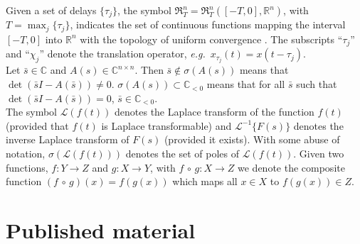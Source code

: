 \indent Given a set of delays $\{\tau_j\}$, the symbol $\mathfrak{R}_T^n=\mathfrak{R}_T^n([-T,0],\mathbb{R}^n)$, with $T=  \max_j\{\tau_j\}$, indicates the set of continuous functions mapping the interval $[-T,0]$ into $\mathbb{R}^n$ with the topology of uniform convergence . The subscripts ``$\tau_j$'' and ``$\chi_j$'' denote the translation operator, \textit{e.g.}\ $x_{\tau_j}(t)=x(t-\tau_j)$.\smallskip\\
\indent Let $\bar s \in \mathbb{C}$ and $A(s)\in \mathbb{C}^{n \times n}$. Then $\bar s\notin\sigma(A(s))$ means that $\det(\bar s I-A(\bar s ))\ne0$. $\sigma(A(s))\subset\mathbb{C}_{<0}$ means that for all $\bar s$ such that $\det(\bar s I-A(\bar s ))=0$, $\bar s \in\mathbb{C}_{<0}$.\smallskip\\
\indent The symbol $\mathcal{L}(f(t))$ denotes the Laplace transform of the function $f(t)$ (provided that $f(t)$ is Laplace transformable) and $\mathcal{L}^{-1}\{F(s)\}$ denotes the inverse Laplace transform of $F(s)$ (provided it exists). With some abuse of notation, $\sigma(\mathcal{L}(f(t)))$ denotes the set of poles of $\mathcal{L}(f(t))$. Given two functions, $f:Y\to Z$ and $g:X\to Y$, with $f\,\circ\,g:X\to Z$ we denote the composite function $(f\,\circ\,g)(x)=f(g(x))$ which maps all $x\in X$ to $f(g(x))\in Z$.


\section{Published material}

\kant[1]
